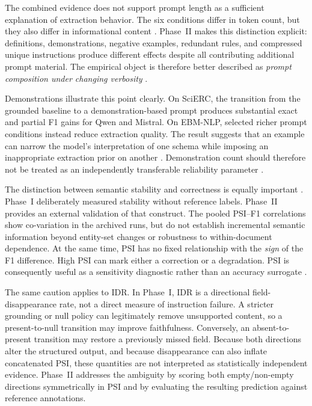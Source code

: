 \documentclass[fleqn,10pt]{wlscirep-authoryear}
\begin{document}
The combined evidence does not support prompt length as a sufficient explanation
of extraction behavior. The six conditions differ in token count, but they also
differ in informational content
\cite{min2022demonstrations,yoo2022groundtruth,tam2024formatRestrictions}.
Phase~II makes this distinction explicit:
definitions, demonstrations, negative examples, redundant rules, and compressed
unique instructions produce different effects despite all contributing additional
prompt material. The empirical object is therefore better described as
\emph{prompt composition under changing verbosity}
\cite{yoo2022groundtruth,mo2024cicl}.

Demonstrations illustrate this point clearly. On SciERC, the transition from the
grounded baseline to a demonstration-based prompt produces substantial exact and
partial F1 gains for Qwen and Mistral. On EBM-NLP, selected richer prompt
conditions instead reduce extraction quality. The result suggests that an example
can narrow the model's interpretation of one schema while imposing an
inappropriate extraction prior on another
\cite{min2022demonstrations,yoo2022groundtruth,mo2024cicl}.
Demonstration count should therefore
not be treated as an independently transferable reliability parameter
\cite{min2022demonstrations,yoo2022groundtruth}.

The distinction between semantic stability and correctness is equally important
\cite{chatterjee2024posix,zhuo2024prosa,lu2024promptSensitivity}.
Phase~I deliberately measured stability without reference labels. Phase~II
provides an external validation of that construct. %
The pooled PSI--F1 correlations show co-variation in the archived runs,
but do not establish incremental semantic information beyond entity-set
changes or robustness to within-document dependence. At the same time,
PSI has no fixed relationship with the \emph{sign} of the F1 difference. High PSI
can mark either a correction or a degradation. PSI is consequently useful as a
sensitivity diagnostic rather than an accuracy surrogate
\cite{chatterjee2024posix,zhuo2024prosa,lu2024promptSensitivity}.

The same caution applies to IDR. In Phase~I, IDR is a directional field-
disappearance rate, not a direct measure of instruction failure. A stricter
grounding or null policy can legitimately remove unsupported content, so a
present-to-null transition may improve faithfulness. Conversely, an
absent-to-present transition may restore a previously missed field. Because both
directions alter the structured output, and because disappearance can also inflate
concatenated PSI, these quantities are not interpreted as statistically
independent evidence. Phase~II addresses the ambiguity by scoring both
empty/non-empty directions symmetrically in PSI and by evaluating the resulting
prediction against reference annotations.
\end{document}
